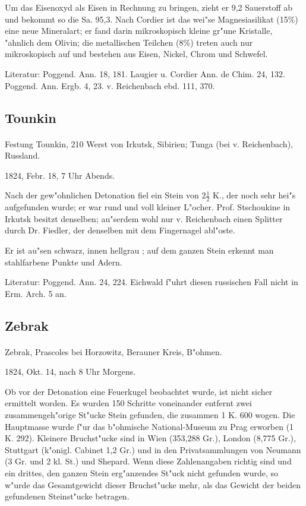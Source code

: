 \documentclass[a4paper, 11pt, oneside]{article}
\begin{document}
Um das Eisenoxyd als Eisen in Rechnung zu bringen, zieht er 9,2 Sauerstoff ab und bekommt so die Sa. 95,3. Nach Cordier ist das wei"se Magnesiasilikat (15\%) eine neue Mineralart; er fand darin mikroskopisch kleine gr"une Kristalle, "ahnlich dem Olivin; die metallischen Teilchen (8\%) treten auch nur mikroskopisch auf und bestehen aus Eisen, Nickel, Chrom und Schwefel.

\footnotesize
Literatur: Poggend. Ann. 18, 181. Laugier u. Cordier Ann. de Chim. 24, 132. Poggend. Ann. Ergb. 4, 23. v. Reichenbach ebd. 111, 370.

\subsection{Tounkin}
\normalsize
\paragraph{}
Festung Tounkin, 210 Werst von Irkutsk, Sibirien; Tunga (bei v. Reichenbach), Russland.

1824, Febr. 18, 7 Uhr Abends.

Nach der gew"ohnlichen Detonation fiel ein Stein von $2\frac{1}{2}$ K., der noch sehr hei"s aufgefunden wurde; er war rund und voll kleiner L"ocher. Prof. Stschoukine in Irkutsk besitzt denselben; au"serdem wohl nur v. Reichenbach einen Splitter durch Dr. Fiedler, der denselben mit dem Fingernagel abl"oste.

Er ist au"sen schwarz, innen hellgrau ; auf dem ganzen Stein erkennt man stahlfarbene Punkte und Adern.

\footnotesize
Literatur: Poggend. Ann. 24, 224. Eichwald f"uhrt diesen russischen Fall nicht in Erm. Arch. 5 an.

\subsection{Zebrak}
\normalsize
\paragraph{}
Zebrak, Prascoles bei Horzowitz, Berauner Kreis, B"ohmen.

1824, Okt. 14, nach 8 Uhr Morgens.

Ob vor der Detonation eine Feuerkugel beobachtet wurde, ist nicht sicher ermittelt worden. Es wurden 150 Schritte voneinander entfernt zwei zusammengeh"orige St"ucke Stein gefunden, die zusammen 1 K. 600 wogen. Die Hauptmasse wurde f"ur das b"ohmische National-Museum zu Prag erworben (1 K. 292). Kleinere Bruchst"ucke sind in Wien (353,288 Gr.), London (8,775 Gr.), Stuttgart (k"onigl. Cabinet 1,2 Gr.) und in den Privatsammlungen von Neumann (3 Gr. und 2 kl. St.) und Shepard. Wenn diese Zahlenangaben richtig sind und ein drittes, den ganzen Stein erg"anzendes St"uck nicht gefunden wurde, so w"urde das Gesamtgewicht dieser Bruchst"ucke mehr, als das Gewicht der beiden gefundenen Steinst"ucke betragen.
\end{document}
